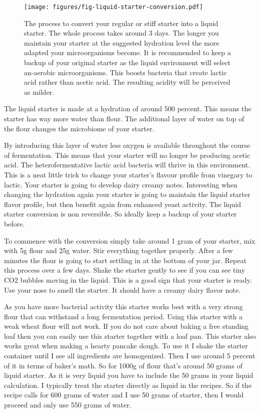 \begin{figure}[!htb]
  \texttt{[image: figures/fig-liquid-starter-conversion.pdf]}
  \caption{The process to convert your regular or stiff starter into a liquid starter. The whole
  process takes around 3 days. The longer you maintain your starter at the
  suggested hydration level the more adapted your microorganisms become. It is recommended
  to keep a backup of your original starter as the liquid environment will select
  an-aerobic microorganisms. This boosts bacteria that create lactic acid rather
  than acetic acid. The resulting acidity will be perceived as milder.}
  \label{fig:liquid-starter-conversion}
\end{figure}

The liquid starter is made at a hydration of around 500 percent. This means
the starter has way more water than flour. The additional layer of water on
top of the flour changes the microbiome of your starter.

By introducing this layer of water less oxygen is available throughout the
course of fermentation. This means that your starter will no longer be
producing acetic acid. The heterofermentative lactic acid bacteria will thrive
in this environment. This is a neat little trick to change your starter's
flavour profile from vinegary to lactic. Your starter is going to develop
dairy creamy notes. Interesting when changing the hydration again your starter
is going to maintain the liquid starter flavor profile, but then benefit again
from enhanced yeast activity. The liquid starter conversion is non reversible.
So ideally keep a backup of your starter before.

To commence with the
conversion simply take around 1 gram of your starter, mix with 5g flour and
25g water. Stir everything together properly. After a few minutes the flour is
going to start settling in at the bottom of your jar. Repeat this process over
a few days. Shake the starter gently to see if you can see tiny CO2 bubbles
moving in the liquid. This is a good sign that your starter is ready. Use your
nose to smell the starter. It should have a creamy dairy flavor note.

As you have more bacterial activity this starter works best with a very strong
flour that can withstand a long fermentation period. Using this starter with a
weak wheat flour will not work. If you do not care about baking a free
standing loaf then you can easily use this starter together with a loaf pan.
This starter also works great when making a hearty pancake dough. To use it I
shake the starter container until I see all ingredients are homogenized. Then
I use around 5 percent of it in terms of baker's math. So for 1000g of flour
that's around 50 grams of liquid starter. As it is very liquid you have to
include the 50 grams in your liquid calculation. I typically treat the starter
directly as liquid in the recipes. So if the recipe calls for 600 grams of water
and I use 50 grams of starter, then I would proceed and only use 550 grams of
water.

